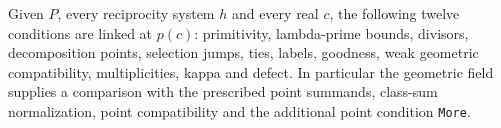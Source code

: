 \begin{formalstatement}\label{sub:T08}

Given $P$, every reciprocity system $h$ and every real $c$, the following
twelve conditions are linked at $p(c)$: primitivity, lambda-prime bounds,
divisors, decomposition points, selection jumps, ties, labels, goodness,
weak geometric compatibility, multiplicities, kappa and defect. In
particular the geometric field supplies a comparison with the prescribed
point summands, class-sum normalization, point compatibility and the
additional point condition \nolinkurl{More}.

\end{formalstatement}
